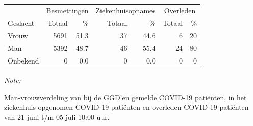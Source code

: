 \documentclass[
  english,
  man,floatsintext]{apa6}
\begin{document}
\begin{table}
\centering\begingroup\fontsize{11}{13}\selectfont

\begin{threeparttable}
\begin{tabular}{lrrrrrr}
\toprule
\multicolumn{1}{c}{ } & \multicolumn{2}{c}{Besmettingen} & \multicolumn{2}{c}{Ziekenhuisopnames} & \multicolumn{2}{c}{Overleden} \\
\cmidrule(l{3pt}r{3pt}){2-3} \cmidrule(l{3pt}r{3pt}){4-5} \cmidrule(l{3pt}r{3pt}){6-7}
Geslacht & Totaal & \% & Totaal & \% & Totaal & \%\\
\midrule
Vrouw & 5691 & 51.3 & 37 & 44.6 & 6 & 20\\
Man & 5392 & 48.7 & 46 & 55.4 & 24 & 80\\
Onbekend & 0 & 0.0 & 0 & 0.0 & 0 & 0\\
\bottomrule
\end{tabular}
\begin{tablenotes}
\item \textit{Note: } 
\item Man-vrouwverdeling van bij de GGD’en gemelde COVID-19 patiënten, in het ziekenhuis opgenomen COVID-19 patiënten en overleden COVID-19 patiënten van 21 juni t/m 05 juli 10:00 uur.
\end{tablenotes}
\end{threeparttable}
\endgroup{}
\end{table}
\newpage
\end{document}
